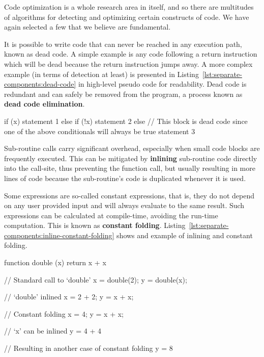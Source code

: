 Code optimization is a whole research area in itself, and so there are
multitudes of algorithms for detecting and optimizing certain constructs of
code. We have again selected a few that we believe are fundamental.

It is possible to write code that can never be reached in any execution path,
known as dead code. A simple example is any code following a return instruction
which will be dead because the return instruction jumps away. A more complex
example (in terms of detection at least) is presented in
Listing~\ref{lst:separate-components:dead-code} in high-level pseudo code for
readability. Dead code is redundant and can safely be removed from the program,
a process known as \textbf{dead code elimination}.

\begin{ccode}[
  caption={Example of dead code},
  label={lst:separate-components:dead-code}]
if (x) {
  statement 1
}
else if (!x) {
  statement 2
}
else {
  // This block is dead code since one of the above conditionals will always be true
  statement 3
}
\end{ccode}

Sub-routine calls carry significant overhead, especially when small code blocks
are frequently executed. This can be mitigated by \textbf{inlining} sub-routine
code directly into the call-site, thus preventing the function call, but usually
resulting in more lines of code because the sub-routine's code is duplicated
whenever it is used.

Some expressions are so-called constant expressions, that is, they do not depend
on any user provided input and will always evaluate to the same result. Such
expressions can be calculated at compile-time, avoiding the run-time
computation. This is known as \textbf{constant
  folding}. Listing~\ref{lst:separate-components:inline-constant-folding} shows
and example of inlining and constant folding.

\begin{ccode}[
  caption={Sub-routine inlining and constant folding},
  label={lst:separate-components:inline-constant-folding}]
function double (x) { return x + x }

// Standard call to `double'
x = double(2);
y = double(x);

// `double' inlined
x = 2 + 2;
y = x + x;

// Constant folding
x = 4;
y = x + x;

// `x' can be inlined
y = 4 + 4

// Resulting in another case of constant folding
y = 8
\end{ccode}

